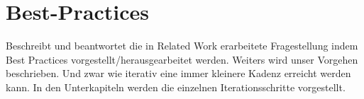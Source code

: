\section{Best-Practices}
\label{sec:best-practices}

\begin{wichtigbox}
Beschreibt und beantwortet die in Related Work erarbeitete Fragestellung indem
Best Practices vorgestellt/herausgearbeitet werden. Weiters wird unser
Vorgehen beschrieben. Und zwar wie iterativ eine immer kleinere Kadenz
erreicht werden kann. In den Unterkapiteln werden die einzelnen
Iterationsschritte vorgestellt.
\end{wichtigbox}








